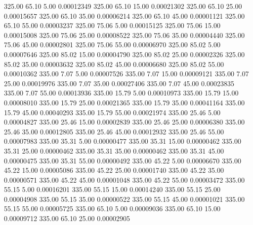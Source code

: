     325.00     65.10      5.00     0.00012349
    325.00     65.10     15.00     0.00021302
    325.00     65.10     25.00     0.00015657
    325.00     65.10     35.00     0.00006214
    325.00     65.10     45.00     0.00001121
    325.00     65.10     55.00     0.00003237
    325.00     75.06      5.00     0.00015125
    325.00     75.06     15.00     0.00015008
    325.00     75.06     25.00     0.00008522
    325.00     75.06     35.00     0.00004440
    325.00     75.06     45.00     0.00002801
    325.00     75.06     55.00     0.00006970
    325.00     85.02      5.00     0.00007646
    325.00     85.02     15.00     0.00004790
    325.00     85.02     25.00     0.00002326
    325.00     85.02     35.00     0.00003632
    325.00     85.02     45.00     0.00006680
    325.00     85.02     55.00     0.00010362
    335.00      7.07      5.00     0.00007526
    335.00      7.07     15.00     0.00009121
    335.00      7.07     25.00     0.00019976
    335.00      7.07     35.00     0.00027406
    335.00      7.07     45.00     0.00023835
    335.00      7.07     55.00     0.00013936
    335.00     15.79      5.00     0.00010973
    335.00     15.79     15.00     0.00008010
    335.00     15.79     25.00     0.00021365
    335.00     15.79     35.00     0.00041164
    335.00     15.79     45.00     0.00040293
    335.00     15.79     55.00     0.00021974
    335.00     25.46      5.00     0.00004827
    335.00     25.46     15.00     0.00002839
    335.00     25.46     25.00     0.00006380
    335.00     25.46     35.00     0.00012805
    335.00     25.46     45.00     0.00012932
    335.00     25.46     55.00     0.00007983
    335.00     35.31      5.00     0.00000477
    335.00     35.31     15.00     0.00000462
    335.00     35.31     25.00     0.00000462
    335.00     35.31     35.00     0.00000462
    335.00     35.31     45.00     0.00000475
    335.00     35.31     55.00     0.00000492
    335.00     45.22      5.00     0.00006670
    335.00     45.22     15.00     0.00005086
    335.00     45.22     25.00     0.00001740
    335.00     45.22     35.00     0.00000571
    335.00     45.22     45.00     0.00001048
    335.00     45.22     55.00     0.00003472
    335.00     55.15      5.00     0.00016201
    335.00     55.15     15.00     0.00014240
    335.00     55.15     25.00     0.00004908
    335.00     55.15     35.00     0.00000522
    335.00     55.15     45.00     0.00001021
    335.00     55.15     55.00     0.00005725
    335.00     65.10      5.00     0.00009036
    335.00     65.10     15.00     0.00009712
    335.00     65.10     25.00     0.00002905

